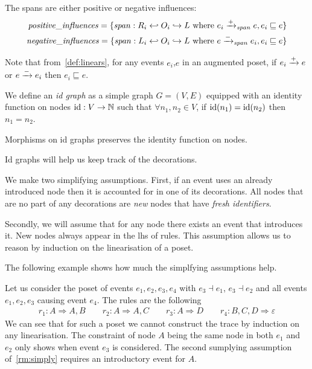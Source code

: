 
The spans are either positive or negative influences:
\begin{align*}
  \mathit{positive\_influences} = \{ \mathit{span}:R_i\hookleftarrow O_i\hookrightarrow L \text{ where } e_i\mathrel{\xrightarrow{+}}_{\mathit{span}} e, e_i\sqsubseteq e\} \\
  \mathit{negative\_influences} = \{ \mathit{span}:L_i\hookleftarrow O_i\hookrightarrow L \text{ where } e\mathrel{\xrightarrow{-}}_{\mathit{span}} e_i, e_i\sqsubseteq e\}
\end{align*}

Note that from~\autoref{def:linears}, for any events $e_i$,$e$ in an augmented poset, if $e_i\mathrel{\xrightarrow{+}} e$ or $e\mathrel{\xrightarrow{-}}e_i$ then $e_i\sqsubseteq e$.

\begin{definition}[Id graphs]
  We define an \emph{id graph} as a simple graph $G = (V,E)$ equipped with an identity function on nodes $\text{id}:V\to \mathbb{N}$ such that $\forall n_1, n_2\in V$, if $\text{id}(n_1)=\text{id}(n_2)$ then $n_1 = n_2$.

  Morphisms on id graphs preserves the identity function on nodes.
\end{definition}

Id graphs will help us keep track of the decorations.

\begin{remark}
\label{rm:simply}
  We make two simplifying assumptions. First, if an event uses an already introduced node then it is accounted for in one of its decorations. All nodes that are no part of any decorations are \emph{new} nodes that have \emph{fresh identifiers}.

Secondly, we will assume that for any node there exists an event that introduces it. New nodes always appear in the lhs of rules.
This assumption allows us to reason by induction on the linearisation of a poset.
\end{remark}

The following example shows how much the simplfying assumptions help.
\begin{example}
 Let us consider the poset of events $e_1,e_2,e_3,e_4$ with $e_3\dashv e_1$, $e_3\dashv e_2$ and all events $e_1,e_2,e_3$ causing event $e_4$. The rules are the following
 \begin{align*}
   r_1:A \Rightarrow A,B\qquad r_2:A \Rightarrow A,C \qquad r_3:A\Rightarrow D\qquad r_4:B,C,D\Rightarrow \varepsilon
 \end{align*}
 We can see that for such a poset we cannot construct the trace by induction on any linearisation. The constraint of node $A$ being the same node in both $e_1$ and $e_2$ only shows when event $e_3$ is considered. The second sumplying assumption of~\autoref{rm:simply} requires an introductory event for $A$.
\end{example}

